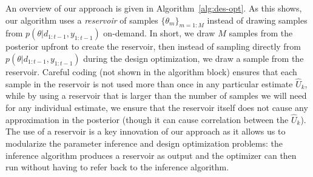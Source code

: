 An overview of our approach is given in Algorithm~\ref{alg:des-opt}.  As this shows, our algorithm uses
a \emph{reservoir} of samples $\{\theta_m\}_{m=1:M}$ instead of drawing samples from 
$p\left(\theta | d_{1:t-1}, y_{1:t-1} \right)$ on-demand.  In short, we draw $M$ samples from the
posterior upfront to create the reservoir, then instead of sampling directly from 
$p\left(\theta | d_{1:t-1}, y_{1:t-1} \right)$ during the design optimization,
we draw a sample from the reservoir.  Careful coding (not shown in the algorithm block) ensures 
that each sample in the reservoir is not used more than once in any particular estimate $\hat{U}_k$, while by using
a reservoir that is larger than the number of samples we will need for any individual estimate, we
ensure that the reservoir itself does not cause any approximation in the posterior (though it can cause correlation
between the $\hat{U}_k$).
The use of a reservoir is a key innovation of our approach as it allows
us to modularize the parameter inference and design optimization problems: the inference algorithm
produces a reservoir as output and the optimizer can then run without having to refer back to the
inference algorithm.


